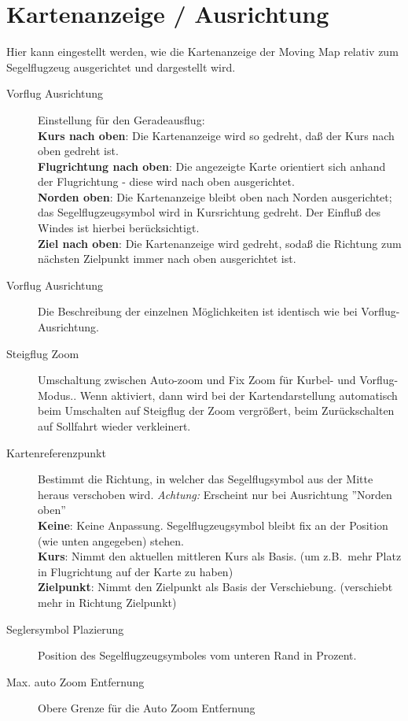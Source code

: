 \section{Kartenanzeige / Ausrichtung}\label{sec:map-projection}
Hier kann eingestellt werden, wie die Kartenanzeige der Moving Map relativ zum Segelflugzeug
ausgerichtet und dargestellt wird.
\begin{description}
\item[Vorflug Ausrichtung]  \label{conf:orientation} Einstellung für den Geradeausflug: \\
  {\bf Kurs nach oben}:   Die Kartenanzeige wird so gedreht, daß der Kurs nach oben gedreht ist.\\
  {\bf Flugrichtung nach oben}:   Die angezeigte Karte orientiert sich anhand der Flugrichtung - diese wird nach oben ausgerichtet.\\
  {\bf Norden oben}:   Die Kartenanzeige bleibt oben nach Norden ausgerichtet; das Segelflugzeugsymbol  wird in Kursrichtung gedreht. Der Einflu\ss{} des Windes ist hierbei berücksichtigt. \\
  {\bf Ziel nach oben}:   Die Kartenanzeige wird gedreht, sodaß die Richtung zum nächsten   Zielpunkt immer nach oben ausgerichtet ist.
\item[Vorflug Ausrichtung] Die Beschreibung der einzelnen Möglichkeiten ist identisch wie bei Vorflug-Ausrichtung.
\item[Steigflug Zoom]  \label{conf:circlingzoom}
Umschaltung zwischen Auto-zoom und Fix Zoom für Kurbel- und Vorflug-Modus..
  Wenn aktiviert, dann wird bei der Kartendarstellung automatisch beim Umschalten auf Steigflug der Zoom vergrößert,
  beim Zurückschalten auf Sollfahrt wieder verkleinert.
\item[Kartenreferenzpunkt] Bestimmt die Richtung, in welcher das Segelflugsymbol
aus der Mitte heraus verschoben wird. \textsl{Achtung:} \achtung Erscheint nur bei Ausrichtung ''Norden oben''\\
  {\bf Keine}: Keine Anpassung. Segelflugzeugsymbol bleibt fix an der Position (wie unten angegeben)  stehen.\\
  {\bf Kurs}: Nimmt den aktuellen mittleren Kurs als Basis. (um z.B.\ mehr Platz in Flugrichtung auf der Karte zu haben) \\
  {\bf Zielpunkt}: Nimmt den Zielpunkt als Basis der Verschiebung. (verschiebt mehr in Richtung Zielpunkt)
\item[Seglersymbol Plazierung]  \label{conf:gliderposition} Position des Segelflugzeugsymboles
vom unteren Rand in Prozent.
\item[Max. auto Zoom Entfernung]  Obere Grenze für die Auto Zoom Entfernung
\end{description}
